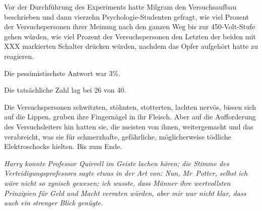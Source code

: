 Vor der Durchführung des Experiments hatte Milgram den Versuchsaufbau beschrieben und dann vierzehn Psychologie-Studenten gefragt, wie viel Prozent der Versuchspersonen ihrer Meinung nach den ganzen Weg bis zur 450-Volt-Stufe gehen würden, wie viel Prozent der Versuchspersonen den Letzten der beiden mit XXX markierten Schalter drücken würden, nachdem das Opfer aufgehört hatte zu reagieren.

Die pessimistischste Antwort war 3\%.

Die tatsächliche Zahl lag bei 26 von 40.

Die Versuchspersonen schwitzten, stöhnten, stotterten, lachten nervös, bissen sich auf die Lippen, gruben ihre Fingernägel in ihr Fleisch. Aber auf die Aufforderung des Versuchsleiters hin hatten sie, die meisten von ihnen, weitergemacht und das verabreicht, was sie für schmerzhafte, gefährliche, möglicherweise tödliche Elektroschocks hielten. Bis zum Ende.

\emph{Harry konnte Professor Quirrell im Geiste lachen hören; die Stimme des Verteidigungsprofessors sagte etwas in der Art von: \emph{Nun, Mr~Potter, selbst ich wäre} \emph{nicht so zynisch gewesen; ich wusste, dass Männer ihre wertvollsten Prinzipien für Geld und Macht verraten würden, aber mir war nicht klar, dass auch ein strenger Blick genügte.}}

